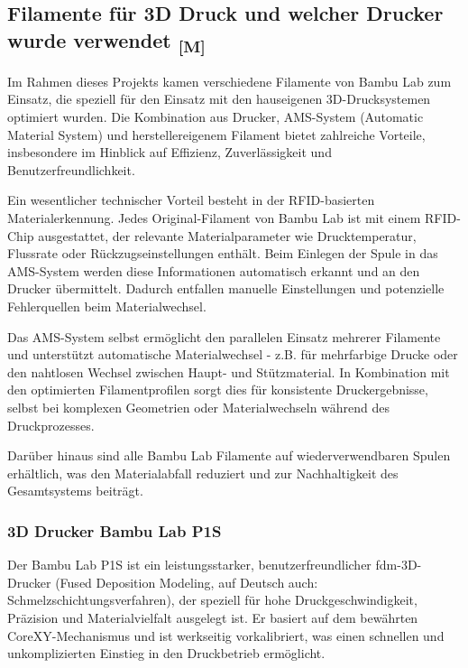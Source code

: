 \documentclass[a4paper,12pt]{article}
\begin{document}
\newpage

\subsection{\texorpdfstring{Filamente für 3D Druck und welcher Drucker wurde verwendet \textsubscript{[M]}}{Filamente für 3D Druck und welcher Drucker wurde verwendet [M]}}
\label{sec:Filamente für 3D-Druck}

Im Rahmen dieses Projekts kamen verschiedene Filamente von Bambu Lab zum Einsatz, die speziell für den Einsatz mit den hauseigenen 3D-Drucksystemen optimiert wurden. Die Kombination aus Drucker, AMS-System (Automatic Material System) und herstellereigenem Filament bietet zahlreiche Vorteile, insbesondere im Hinblick auf Effizienz, Zuverlässigkeit und Benutzerfreundlichkeit.

Ein wesentlicher technischer Vorteil besteht in der RFID-basierten Materialerkennung. Jedes Original-Filament von Bambu Lab ist mit einem RFID-Chip ausgestattet, der relevante Materialparameter wie Drucktemperatur, Flussrate oder Rückzugseinstellungen enthält. Beim Einlegen der Spule in das AMS-System werden diese Informationen automatisch erkannt und an den Drucker übermittelt. Dadurch entfallen manuelle Einstellungen und potenzielle Fehlerquellen beim Materialwechsel.

Das AMS-System selbst ermöglicht den parallelen Einsatz mehrerer Filamente und unterstützt automatische Materialwechsel - z.B. für mehrfarbige Drucke oder den nahtlosen Wechsel zwischen Haupt- und Stützmaterial. In Kombination mit den optimierten Filamentprofilen sorgt dies für konsistente Druckergebnisse, selbst bei komplexen Geometrien oder Materialwechseln während des Druckprozesses.

Darüber hinaus sind alle Bambu Lab Filamente auf wiederverwendbaren Spulen erhältlich, was den Materialabfall reduziert und zur Nachhaltigkeit des Gesamtsystems beiträgt.\newline

\subsubsection{3D Drucker Bambu Lab P1S}
\label{sec:Bambu Lab P1S}

Der Bambu Lab P1S ist ein leistungsstarker, benutzerfreundlicher \gls{fdm}-3D-Drucker (Fused Deposition Modeling, auf Deutsch auch: Schmelzschichtungsverfahren), der speziell für hohe Druckgeschwindigkeit, Präzision und Materialvielfalt ausgelegt ist. Er basiert auf dem bewährten CoreXY-Mechanismus und ist werkseitig vorkalibriert, was einen schnellen und unkomplizierten Einstieg in den Druckbetrieb ermöglicht.
\end{document}
